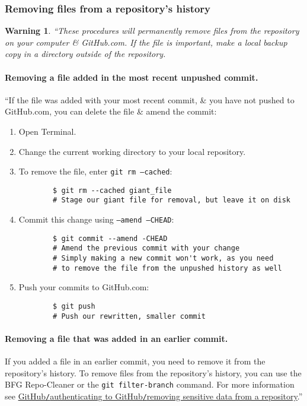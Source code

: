 \documentclass[oneside]{book}
\numberwithin{equation}{section}
\newtheorem{warning}{Warning}[section]
\begin{document}
\subsubsection{Removing files from a repository's history}

\begin{warning}
	``These procedures will permanently remove files from the repository on your computer \& GitHub.com. If the file is important, make a local backup copy in a directory outside of the repository.
\end{warning}

\paragraph{Removing a file added in the most recent unpushed commit.} ``If the file was added with your most recent commit, \& you have not pushed to GitHub.com, you can delete the file \& amend the commit:
\begin{enumerate}
	\item Open Terminal.
	\item Change the current working directory to your local repository.
	\item To remove the file, enter \texttt{git rm --cached}:
	\begin{verbatim}
		$ git rm --cached giant_file
		# Stage our giant file for removal, but leave it on disk
	\end{verbatim}
	\item Commit this change using \texttt{--amend --CHEAD}:
	\begin{verbatim}
		$ git commit --amend -CHEAD
		# Amend the previous commit with your change
		# Simply making a new commit won't work, as you need
		# to remove the file from the unpushed history as well
	\end{verbatim}
	\item Push your commits to GitHub.com:
	\begin{verbatim}
		$ git push
		# Push our rewritten, smaller commit
	\end{verbatim}
\end{enumerate}

\paragraph{Removing a file that was added in an earlier commit.} If you added a file in an earlier commit, you need to remove it from the repository's history. To remove files from the repository's history, you can use the BFG Repo-Cleaner or the \texttt{git filter-branch} command. For more information see \href{https://docs.github.com/en/github/authenticating-to-github/removing-sensitive-data-from-a-repository}{GitHub\texttt{/}authenticating to GitHub\texttt{/}removing sensitive data from a repository}.''
\end{document}
